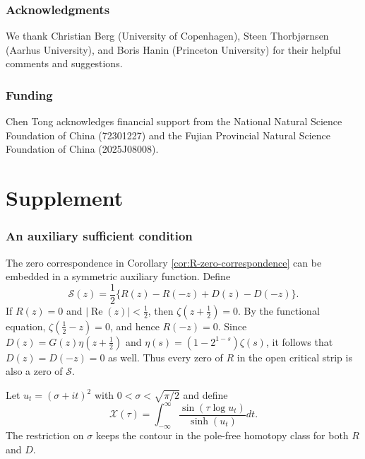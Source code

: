 \documentclass[12pt,english]{article}
\theoremstyle{plain} %
\theoremstyle{remark} %
\begin{document}
\section*{Acknowledgments}
We thank Christian Berg (University of Copenhagen), Steen Thorbj{\o}rnsen (Aarhus University), and Boris Hanin (Princeton University) for their helpful comments and suggestions.

\section*{Funding}
Chen Tong acknowledges financial support from the National Natural Science Foundation of China (72301227) and the Fujian Provincial Natural Science Foundation of China (2025J08008).

{\footnotesize

}{\footnotesize\par}

\newpage

\appendix
\setcounter{section}{0}
\setcounter{equation}{0}
\setcounter{table}{0}
\setcounter{lemma}{0}

\part*{Supplement}


\section{An auxiliary sufficient condition}
\label{subsec:symmetric-sufficient-condition}

The zero correspondence in Corollary \ref{cor:R-zero-correspondence} can be
embedded in a symmetric auxiliary function. Define
$$
\mathcal{S}(z)
=
\frac{1}{2}\{R(z)-R(-z)+D(z)-D(-z)\}.
$$
If $R(z)=0$ and $|\operatorname{Re}(z)|<\tfrac{1}{2}$, then
$\zeta(z+\tfrac{1}{2})=0$. By the functional equation,
$\zeta(\tfrac{1}{2}-z)=0$, and hence $R(-z)=0$. Since
$D(z)=G(z)\eta(z+\tfrac{1}{2})$ and
$\eta(s)=(1-2^{1-s})\zeta(s)$, it follows that $D(z)=D(-z)=0$ as well.
Thus every zero of $R$ in the open critical strip is also a zero of
$\mathcal{S}$.

Let $u_t=(\sigma+it)^2$ with $0<\sigma<\sqrt{\pi/2}$ and define
\begin{equation}
\mathcal{X}(\tau)
=
\int_{-\infty}^{\infty}
\frac{\sin(\tau\log u_t)}{\sinh(u_t)}dt.
\label{eq:X-definition}
\end{equation}
The restriction on $\sigma$ keeps the contour in the pole-free homotopy class
for both $R$ and $D$.
\end{document}
